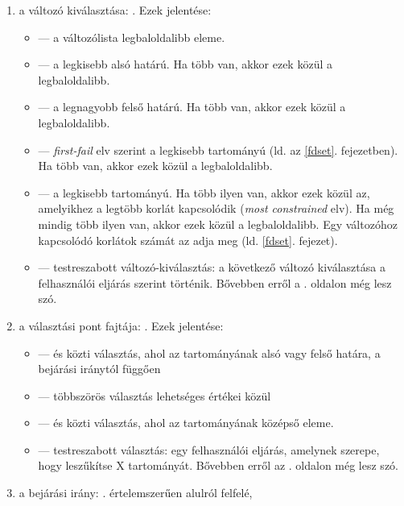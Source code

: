 \begin{enumerate}
\item a változó kiválasztása: . Ezek jelentése:
	\begin{itemize}
	\item {} --- a változólista legbaloldalibb eleme.
	\item {} --- a legkisebb alsó határú. Ha több van, akkor ezek közül
	a legbaloldalibb.
	\item {} --- a legnagyobb felső határú. Ha több van, akkor ezek közül
	a legbaloldalibb.
	\item {} --- \emph{first-fail} elv szerint a legkisebb tartományú
	(ld.  az \ref{fdset}. fejezetben). Ha több van, akkor ezek közül
	a legbaloldalibb.
	\item {} --- a legkisebb tartományú. Ha több ilyen van, akkor ezek
    	közül az, amelyikhez a legtöbb korlát kapcsolódik (\emph{most constrained} elv).
	Ha még mindig több ilyen van, akkor ezek közül a legbaloldalibb. Egy változóhoz
	kapcsolódó korlátok számát az  adja meg (ld. \ref{fdset}. fejezet).
	\item {} --- testreszabott változó-kiválasztás: a következő
	változó kiválasztása a  felhasználói eljárás szerint történik. Bővebben
	erről a \pageref{variable:sel}. oldalon még lesz szó.
	\end{itemize}
\item a választási pont fajtája: . Ezek
jelentése:
	\begin{itemize}
	\item {} ---  és  közti választás, ahol
	 az  tartományának alsó vagy felső határa, a bejárási iránytól
	függően
	\item {} --- többszörös választás  lehetséges értékei közül
	\item {} ---  és  közti választás, ahol
	 az  tartományának középső eleme.
	\item {} --- testreszabott választás:  egy felhasználói
	eljárás, amelynek szerepe, hogy leszűkítse X tartományát. Bővebben erről
	az \pageref{value:enum}. oldalon még lesz szó.
	\end{itemize}
\item a bejárási irány: .  értelemszerűen alulról felfelé,

\end{enumerate}
